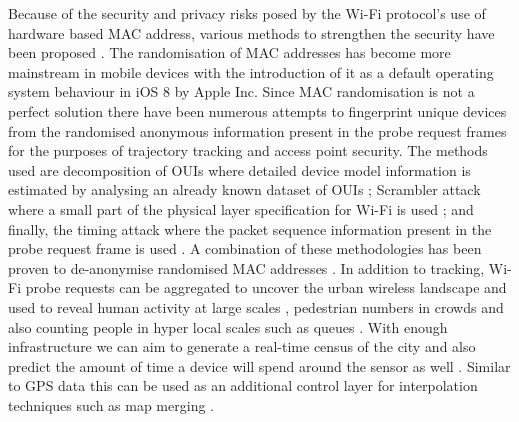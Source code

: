 Because of the security and privacy risks posed by the Wi-Fi protocol’s use of hardware based MAC address, various methods to strengthen the security have been proposed \citep{pang2007, greenstein2008}.
The randomisation of MAC addresses has become more mainstream in mobile devices with the introduction of it as a default operating system behaviour in iOS 8 by Apple Inc.
Since MAC randomisation is not a perfect solution \citep{mathieucunche2016} there have been numerous attempts to fingerprint unique devices from the randomised anonymous information present in the probe request frames for the purposes of trajectory tracking and access point security.
The methods used are decomposition of OUIs where detailed device model information is estimated by analysing an already known dataset of OUIs \cite{martin2016}; Scrambler attack where a small part of the physical layer specification for Wi-Fi is used \citep{bloessl2015}; and finally, the timing attack where the packet sequence information present in the probe request frame is used \citep{matte2016, cheng2016}.
A combination of these methodologies has been proven to de-anonymise randomised MAC addresses \citep{vanhoef2016}.
In addition to tracking, Wi-Fi probe requests can be aggregated to uncover the urban wireless landscape \citep{rose2010} and used to reveal human activity at large scales \citep{qin2013}, pedestrian numbers in crowds \citep{schauer2014, fukuzaki2015} and also counting people in hyper local scales such as queues \citep{wang2013}.
With enough infrastructure we can aim to generate a real-time census of the city \citep{kontokosta2016} and also predict the amount of time a device will spend around the sensor as well \citep{manweiler2013}.
Similar to GPS data this can be used as an additional control layer for interpolation techniques such as map merging \citep{erinc2013}.


